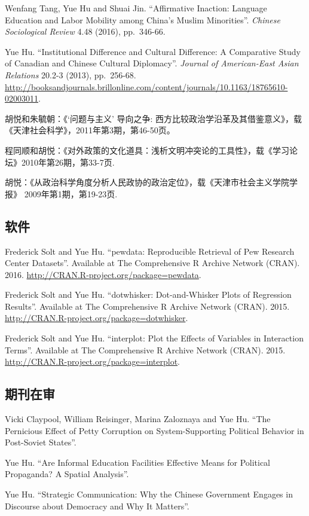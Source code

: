 \documentclass[10.5pt,]{article}
\begin{document}
Wenfang Tang, Yue Hu and Shuai Jin. ``Affirmative Inaction: Language
Education and Labor Mobility among China's Muslim Minorities''.
\emph{Chinese Sociological Review} 4.48 (2016), pp.~346-66.

Yue Hu. ``Institutional Difference and Cultural Difference: A
Comparative Study of Canadian and Chinese Cultural Diplomacy''.
\emph{Journal of American-East Asian Relations} 20.2-3 (2013),
pp.~256-68.
\url{http://booksandjournals.brillonline.com/content/journals/10.1163/18765610-02003011}.

胡悦和朱毓朝：《`问题与主义' 导向之争:
西方比较政治学沿革及其借鉴意义》，载《天津社会科学》，2011年第3期，第46-50页。

程同顺和胡悦：《对外政策的文化道具：浅析文明冲突论的工具性》，载《学习论坛》2010年第26期，第33-7页.

胡悦：《从政治科学角度分析人民政协的政治定位》，载《天津市社会主义学院学报》
2009年第1期，第19-23页.

\subsection{软件}

Frederick Solt and Yue Hu. ``pewdata: Reproducible Retrieval of Pew
Research Center Datasets''. Available at The Comprehensive R Archive
Network (CRAN). 2016. \url{http://CRAN.R-project.org/package=pewdata}.

Frederick Solt and Yue Hu. ``dotwhisker: Dot-and-Whisker Plots of
Regression Results''. Available at The Comprehensive R Archive Network
(CRAN). 2015. \url{http://CRAN.R-project.org/package=dotwhisker}.

Frederick Solt and Yue Hu. ``interplot: Plot the Effects of Variables in
Interaction Terms''. Available at The Comprehensive R Archive Network
(CRAN). 2015. \url{http://CRAN.R-project.org/package=interplot}.

\subsection{期刊在审}

Vicki Claypool, William Reisinger, Marina Zaloznaya and Yue Hu. ``The
Pernicious Effect of Petty Corruption on System-Supporting Political
Behavior in Post-Soviet States''.

Yue Hu. ``Are Informal Education Facilities Effective Means for
Political Propaganda? A Spatial Analysis''.

Yue Hu. ``Strategic Communication: Why the Chinese Government Engages in
Discourse about Democracy and Why It Matters''.
\end{document}
